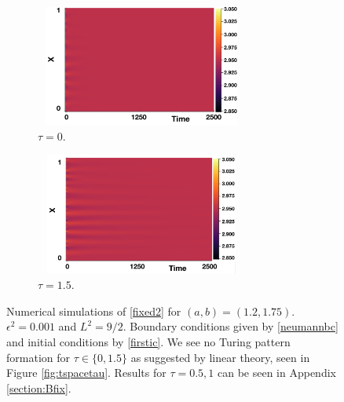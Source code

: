\begin{figure}[H]
    \centering
    \begin{subfigure}[t]{0.45\textwidth}
        \centering
        \includegraphics[width=7cm,height=4cm]{p3t0.png}
        \caption{$\tau=0$.}
        \label{}
    \end{subfigure}
    \hfill
    \begin{subfigure}[t]{0.45\textwidth}
        \centering
        \includegraphics[width=7cm,height=4cm]{p3t15.png}
        \caption{$\tau=1.5$.}
        \label{}
    \end{subfigure}
    \caption{Numerical simulations of \eqref{fixed2} for $(a,b)=(1.2,1.75)$. $\epsilon^2=0.001$ and $L^2=9/2$. Boundary conditions given by \eqref{neumannbc} and initial conditions by \eqref{firstic}. We see no Turing pattern formation for $\tau\in\{0,1.5\}$ as suggested by linear theory, seen in Figure \ref{fig:tspacetau}. Results for $\tau=0.5,1$ can be seen in Appendix \ref{section:Bfix}.}
    \label{fig:testturing2}
\end{figure}

